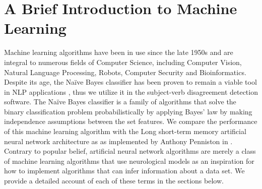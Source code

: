 \documentclass{article}
\begin{document}
\section{A Brief Introduction to Machine Learning}
Machine learning algorithms have been in use since the late 1950s and are integral to numerous fields of Computer Science, including Computer Vision, Natural Language Processing, Robots, Computer Security and Bioinformatics. Despite its age, the Naïve Bayes classifier has been proven to remain a viable tool in NLP applications \citep{russell2003artificial} \citep{AnderewNG}, thus we utilize it in the subject-verb disagreement detection software. The Naïve Bayes classifier is a family of algorithms that solve the binary classification problem probabilistically by applying Bayes' law by making independence assumptions between the set features. We compare the performance of this machine learning algorithm with the Long short-term memory artificial neural network architecture as as implemented by Anthony Penniston in \citep{Ryerson}. Contrary to popular belief, artificial neural network algorithms are merely a class of machine learning algorithms that use neurological models as an inspiration for how to implement algorithms that can infer information about a data set. We provide a detailed account of each of these terms in the sections below.
\end{document}
